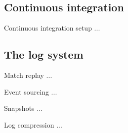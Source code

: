 \documentclass{beamer}
\begin{document}
\subsection{Continuous integration}
\begin{frame}{Continuous integration setup}
...
\end{frame}
\subsection{The log system}
\begin{frame}{Match replay}
...
\end{frame}
\begin{frame}{Event sourcing}
...
\end{frame}
\begin{frame}{Snapshots}
...
\end{frame}
\begin{frame}{Log compression}
...
\end{frame}
\end{document}
